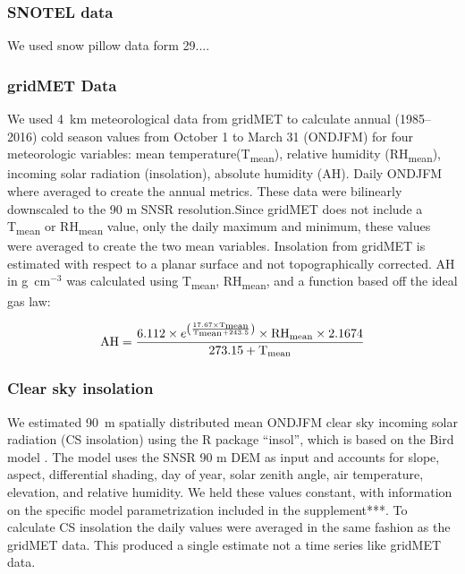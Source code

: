 \hypertarget{ch2-do-2}{\subsubsection{SNOTEL data}\label{ch2-do-2}}

We used snow pillow data form 29....

\hypertarget{ch2-do-2}{\subsubsection{gridMET Data}\label{ch2-do-2}}

We used 4~km meteorological data from gridMET \citep{abatzoglouDevelopmentGriddedSurface2013} to calculate annual (1985--2016) cold season values from October 1 to March 31 (ONDJFM) for four meteorologic variables: mean temperature(T\textsubscript{mean}), relative humidity (RH\textsubscript{mean}), incoming solar radiation (insolation), absolute humidity (AH). Daily ONDJFM where averaged to create the annual metrics. These data were bilinearly downscaled to the 90 m SNSR resolution.Since gridMET does not include a T\textsubscript{mean} or RH\textsubscript{mean} value, only the daily maximum and minimum, these values were averaged to create the two mean variables. Insolation from gridMET is estimated with respect to a planar surface and not topographically corrected. AH in g~cm$^{-3}$ was calculated using T\textsubscript{mean}, RH\textsubscript{mean}, and a function based off the ideal gas law:

\begin{equation}
\text{AH} = \frac{{6.112 \times e^{\left(\frac{{17.67 \times \text{T}\textsubscript{mean}}}{{\text{T}\textsubscript{mean} + 243.5}} \right)} \times \text{RH}\textsubscript{mean} \times 2.1674}} {{273.15 + \text{T}\textsubscript{mean}}}
\label{eq:ah}
\end{equation}


\hypertarget{ch2-do-2}{\subsubsection{Clear sky insolation}\label{ch2-do-2}}


We estimated 90~m spatially distributed mean ONDJFM clear sky incoming solar radiation (CS insolation) using the R package “insol”, which is based on the Bird model \citep{birdReviewEvaluationImprovement1981}. The model uses the SNSR 90 m DEM as input and accounts for slope, aspect, differential shading, day of year, solar zenith angle, air temperature, elevation, and relative humidity. We held these values constant, with information on the specific model parametrization included in the supplement***. To calculate CS insolation the daily values were averaged in the same fashion as the gridMET data. This produced a single estimate not a time series like gridMET data.


